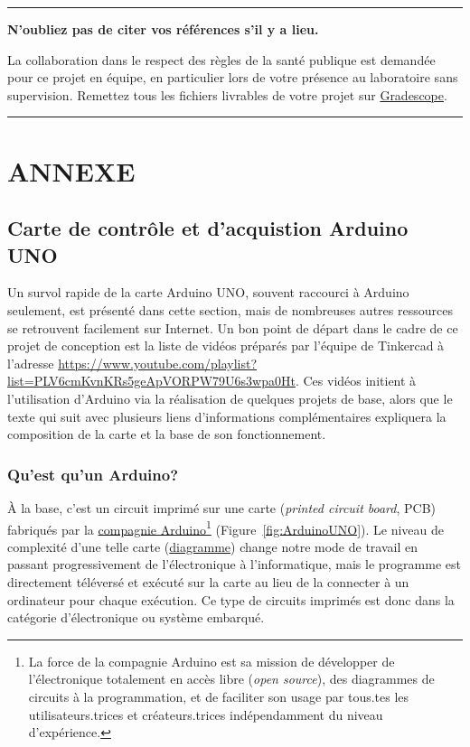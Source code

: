 \documentclass[english,french,12pt]{article}
\begin{document}
\vfill
\hrule
\vspace{0.3em}
\centering
\textbf{N'oubliez pas de citer vos références s'il y a lieu.}\par
\vspace{-0.3em}
La collaboration dans le respect des règles de la santé publique est demandée pour ce projet en équipe, en particulier lors de votre présence au laboratoire sans supervision. Remettez tous les fichiers livrables de votre projet sur \href{https://www.gradescope.com/}{Gradescope}.\par
\vspace{1em}
\hrule

\newpage
%
\justify
\section*{ANNEXE}
\label{sec:annexe}

\subsection*{Carte de contrôle et d'acquistion Arduino UNO}
Un survol rapide de la carte Arduino UNO, souvent raccourci à Arduino seulement, est présenté dans cette section, mais de nombreuses autres ressources se retrouvent facilement sur Internet. Un bon point de départ dans le cadre de ce projet de conception est la liste de vidéos préparés par l'équipe de Tinkercad à l'adresse \url{https://www.youtube.com/playlist?list=PLV6cmKvnKRs5geApVORPW79U6s3wpa0Ht}. Ces vidéos initient à l'utilisation d'Arduino via la réalisation de quelques projets de base, alors que le texte qui suit avec plusieurs liens d'informations complémentaires expliquera la composition de la carte et la base de son fonctionnement. 

\subsubsection*{Qu'est qu'un Arduino?}
À la base, c'est un circuit imprimé sur une carte (\textit{printed circuit board}, PCB) fabriqués par la \href{https://www.arduino.cc/}{ compagnie Arduino}\footnote{La force de la compagnie Arduino est sa mission de développer de l'électronique totalement en accès libre (\textit{open source}), des diagrammes de circuits à la programmation, et de faciliter son usage par tous.tes les utilisateurs.trices et créateurs.trices indépendamment du niveau d'expérience.} (Figure~\ref{fig:ArduinoUNO}). Le niveau de complexité d'une telle carte (\href{https://content.arduino.cc/assets/UNO-TH_Rev3e_sch.pdf}{diagramme}) change notre mode de travail en passant progressivement de l'électronique à l'informatique, mais le programme est directement téléversé et exécuté sur la carte au lieu de la connecter à un ordinateur pour chaque exécution. Ce type de circuits imprimés est donc dans la catégorie d'électronique ou système embarqué.
\end{document}
